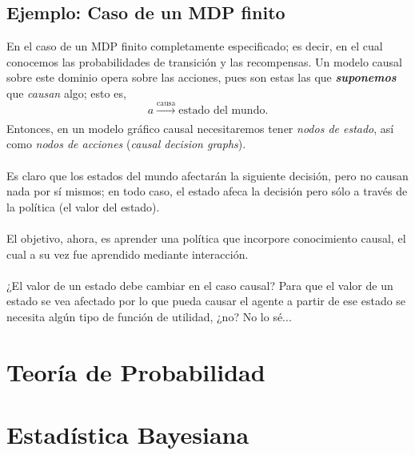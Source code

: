 \documentclass[11pt]{article}
\theoremstyle{plain}
\begin{document}
\subsection{Ejemplo: Caso de un MDP finito}
En el caso de un MDP finito completamente especificado; es decir, en el cual conocemos las probabilidades de transición y las recompensas. Un modelo causal sobre este dominio opera sobre las acciones, pues son estas las que \textbf{\textit{suponemos}} que \textit{causan} algo; esto es, 
\[ a \xrightarrow[]{\text{causa}} \textrm{estado del mundo}. \]
Entonces, en un modelo gráfico causal necesitaremos tener \textit{nodos de estado}, así como \textit{nodos de acciones} (\textit{causal decision graphs}).\\
\\
Es claro que los estados del mundo afectarán la siguiente decisión, pero no causan nada por sí mismos; en todo caso, el estado afeca la decisión pero sólo a través de la política (el valor del estado).\\
\\
El objetivo, ahora, es aprender una política que incorpore conocimiento causal, el cual a su vez fue aprendido mediante interacción.\\
\\
¿El valor de un estado debe cambiar en el caso causal? Para que el valor de un estado se vea afectado por lo que pueda causar el agente a partir de ese estado se necesita algún tipo de función de utilidad, ¿no? No lo sé...
\newpage


\appendix
\section{Teoría de Probabilidad}
\section{Estadística Bayesiana}
\end{document}
